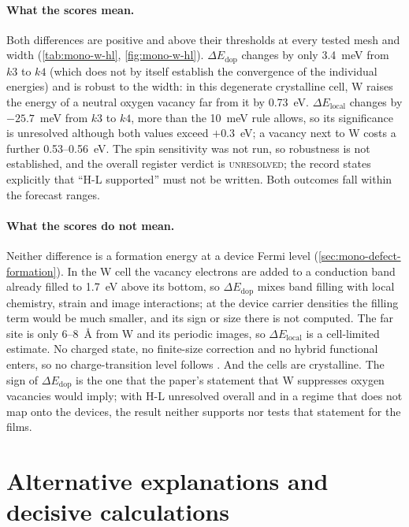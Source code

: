 \paragraph{What the scores mean.} Both differences are positive and above their thresholds at every tested mesh and
width (\cref{tab:mono-w-hl}, \cref{fig:mono-w-hl}). $\Delta E_{\mathrm{dop}}$ changes by only 3.4~meV from $k3$ to $k4$ (which
does not by itself establish the convergence of the individual energies) and is robust to the width: in this degenerate crystalline cell, W raises the energy of a neutral oxygen vacancy far from it by 0.73~eV.
$\Delta E_{\mathrm{local}}$ changes by $-25.7$~meV from $k3$ to $k4$, more than the 10~meV rule allows, so its
significance is unresolved although both values exceed $+0.3$~eV; a vacancy next to W costs a further 0.53--0.56~eV.
The spin sensitivity was not run, so robustness is not established, and the overall register verdict is
\textsc{unresolved}; the record states explicitly that ``H-L supported'' must not be written. Both outcomes fall within the forecast ranges.

\paragraph{What the scores do not mean.} Neither difference is a formation energy at a device Fermi level
(\cref{sec:mono-defect-formation}). In the W cell the vacancy electrons are added to a conduction band already filled to
1.7~eV above its bottom, so $\Delta E_{\mathrm{dop}}$ mixes band filling with local chemistry, strain and image
interactions; at the device carrier densities the filling term would be much smaller, and its sign or size there is not
computed. The far site is only 6--8~\AA{} from W and its periodic images, so $\Delta E_{\mathrm{local}}$ is a cell-limited
estimate. No charged state, no finite-size correction and no hybrid functional enters, so no charge-transition level
follows \citep{Chatratin2019}. And the cells are crystalline. The sign of $\Delta E_{\mathrm{dop}}$ is the one that the
paper's statement that W suppresses oxygen vacancies would imply; with H-L unresolved overall and in a regime that does
not map onto the devices, the result neither supports nor tests that statement for the films.

\section{Alternative explanations and decisive calculations}
\label{sec:mono-w-alt}

